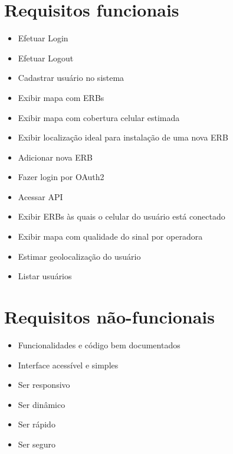 \documentclass[]{politex}
\begin{document}
\section{Requisitos funcionais}
\begin{itemize}
\item Efetuar Login
\item Efetuar Logout
\item Cadastrar usuário no sistema
\item Exibir mapa com ERBs
\item Exibir mapa com cobertura celular estimada
\item Exibir localização ideal para instalação de uma nova ERB
\item Adicionar nova ERB
\item Fazer login por OAuth2
\item Acessar API
\item Exibir ERBs às quais o celular do usuário está conectado
\item Exibir mapa com qualidade do sinal por operadora
\item Estimar geolocalização do usuário
\item Listar usuários
\end{itemize}

\section{Requisitos não-funcionais}
\begin{itemize}
\item Funcionalidades e código bem documentados
\item Interface acessível e simples
\item Ser responsivo
\item Ser dinâmico
\item Ser rápido
\item Ser seguro   
\end{itemize}
\end{document}
